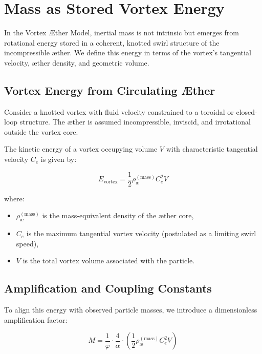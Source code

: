 \documentclass[twocolumn,aps,pre,floatfix,nofootinbib]{revtex4-2}
\begin{document}
\section{Mass as Stored Vortex Energy}

In the Vortex \AE ther Model, inertial mass is not intrinsic but emerges from rotational energy stored in a coherent, knotted swirl structure of the incompressible æther. We define this energy in terms of the vortex's tangential velocity, æther density, and geometric volume.

\subsection{Vortex Energy from Circulating Æther}

Consider a knotted vortex with fluid velocity constrained to a toroidal or closed-loop structure. The æther is assumed incompressible, inviscid, and irrotational outside the vortex core.

The kinetic energy of a vortex occupying volume \( V \) with characteristic tangential velocity \( C_e \) is given by:

\begin{equation}
E_{\text{vortex}} = \frac{1}{2} \rho_\text{\ae}^{(\text{mass})} C_e^2 V
\end{equation}

where:
\begin{itemize}
\item \( \rho_\text{\ae}^{(\text{mass})} \) is the mass-equivalent density of the æther core,
\item \( C_e \) is the maximum tangential vortex velocity (postulated as a limiting swirl speed),
\item \( V \) is the total vortex volume associated with the particle.
\end{itemize}

\subsection{Amplification and Coupling Constants}

To align this energy with observed particle masses, we introduce a dimensionless amplification factor:

\begin{equation}
M = \frac{1}{\varphi} \cdot \frac{4}{\alpha} \cdot \left( \frac{1}{2} \rho_\text{\ae}^{(\text{mass})} C_e^2 V \right)
\end{equation}
\end{document}
